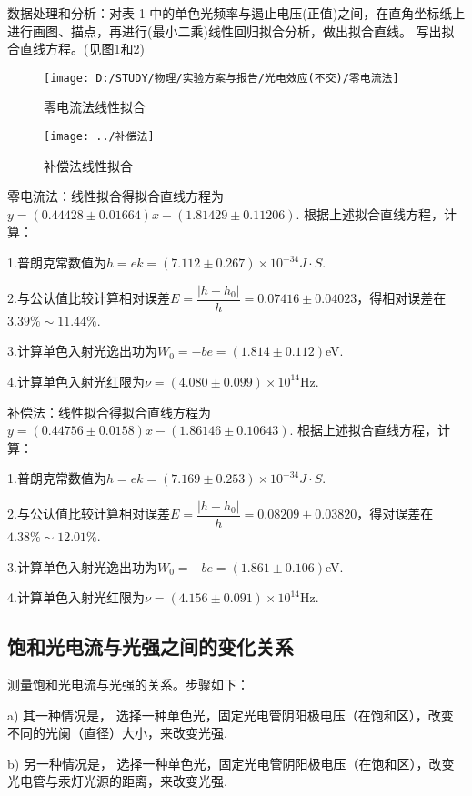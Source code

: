 \documentclass[11pt]{article}
\begin{document}
数据处理和分析：对表 1 中的单色光频率与遏止电压(正值)之间，在直角坐标纸上进行画图、描点，再进行(最小二乘)线性回归拟合分析，做出拟合直线。 写出拟合直线方程。(见图\ref{fig:2}和\ref{fig:3})
\begin{figure}[htbp]
	\centering
	\texttt{[image: D:/STUDY/物理/实验方案与报告/光电效应(不交)/零电流法]}
	\caption{零电流法线性拟合}
	\label{fig:2}
\end{figure}
\begin{figure}[htbp]
	\centering
	\texttt{[image: ../补偿法]}
	\caption{补偿法线性拟合}
	\label{fig:3}
\end{figure}

\heiti 零电流法：\songti 线性拟合得拟合直线方程为$ y=(0.44428\pm 0.01664)x-(1.81429\pm 0.11206) $.
根据上述拟合直线方程，计算：

1.普朗克常数值为$ h=ek=(7.112\pm 0.267)\times 10^{-34}J\cdot S $.

2.与公认值比较计算相对误差$ E=\dfrac{\left| h-h_0\right| }{h}=0.07416 \pm 0.04023$，得相对误差在$ 3.39\%\sim 11.44\% $.

3.计算单色入射光逸出功为$ W_0=-be=(1.814\pm 0.112) $eV.

4.计算单色入射光红限为$ \nu=(4.080\pm 0.099)\times 10^{14} $Hz.

\heiti 补偿法：\songti 线性拟合得拟合直线方程为$ y=(0.44756\pm 0.0158)x-(1.86146\pm 0.10643) $.
根据上述拟合直线方程，计算：

1.普朗克常数值为$ h=ek=(7.169\pm 0.253)\times 10^{-34}J\cdot S $.

2.与公认值比较计算相对误差$ E=\dfrac{\left| h-h_0\right| }{h}=0.08209\pm 0.03820$，得对误差在$ 4.38\%\sim 12.01\% $.

3.计算单色入射光逸出功为$ W_0=-be=(1.861\pm 0.106) $eV.

4.计算单色入射光红限为$ \nu=(4.156\pm 0.091)\times 10^{14} $Hz.
\subsection{饱和光电流与光强之间的变化关系}
测量饱和光电流与光强的关系。步骤如下：

\kaishu a) 其一种情况是， 选择一种单色光，固定光电管阴阳极电压（在饱和区），改变不同的光阑（直径）大小，来改变光强.

b) 另一种情况是， 选择一种单色光，固定光电管阴阳极电压（在饱和区），改变光电管与汞灯光源的距离，来改变光强.
\end{document}
